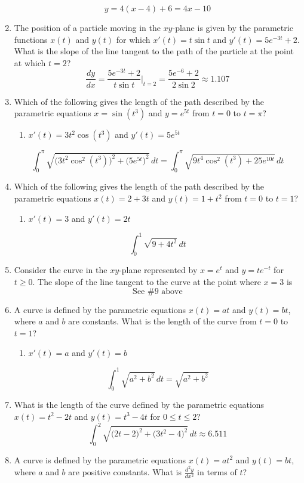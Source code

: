 \documentclass[12pt]{article}
\begin{document}
\begin{enumerate}
\begin{enumerate}
    \end{enumerate}
    $$y= 4(x-4)+6 = \boxed{4x - 10}$$
    \item The position of a particle moving in the $xy$-plane is given by the parametric functions $x(t)$ and $y(t)$ for which $x'(t)=t \sin t$ and $y'(t)=5e^{-3t}+2$. What is the slope of the line tangent to the path of the particle at the point at which $t=2$?
    $$\frac{dy}{dx} = \frac{5e^{-3t}+2}{t \sin t}\biggr\rvert_{t= 2} = \frac{5e^{-6}+2}{2\sin 2} \approx{\boxed{1.107}}$$
    \item Which of the following gives the length of the path described by the parametric equations $x=\sin(t^3)$ and $y=e^{5t}$ from $t=0$ to $t=\pi$?
    \begin{enumerate}
        \item $x'(t) = 3t^2 \cos (t^3)$ and $y'(t) = 5e^{5t}$
    \end{enumerate}
    $$\int_{0}^{\pi} \sqrt{\big(3t^2 \cos^2 (t^3)\big)^2+ \big(5e^{5t} \big)^2} \, dt = \boxed{\int_{0}^{\pi} \sqrt{9t^4 \cos^2 (t^3)+ 25e^{10t}} \, dt }$$
    \item Which of the following gives the length of the path described by the parametric equations $x(t)=2+3t$
    and $y(t)=1+t^2$ from $t=0$ to $t=1$?
    \begin{enumerate}
        \item $x'(t) = 3$ and $y'(t) = 2t$
    \end{enumerate}
    $$\boxed{\int_{0}^{1} \sqrt{9 +4t^2} \, dt }$$
    \item Consider the curve in the $xy$-plane represented by $x=e^t$ and $y=te^{-t}$ for $t\geq 0$. The slope of the line tangent to the curve at the point where $x=3$ is
    $$ \boxed{\text{See \# 9 above}}$$
    \item A curve is defined by the parametric equations $x(t)=at$ and $y(t)=bt$, where $a$ and $b$ are constants. What is the length of the curve from $t=$0 to $t=1$?
    \begin{enumerate}
        \item $x'(t) = a$ and $y'(t) = b$
    \end{enumerate}
    $$\int_{0}^1 \sqrt{a^2+b^2} \, dt = \boxed{\sqrt{a^2+b^2}}$$
    \item What is the length of the curve defined by the parametric equations $x(t)=t^2-2t$ and $y(t)=t^3-4t$ for $0 \leq t \leq 2$?
    $$\int_{0}^{2} \sqrt{\big(2t-2\big)^2 + \big(3t^2-4\big)^2} \, dt \approx \boxed{6.511}$$
    \item A curve is defined by the parametric equations $x(t)=at^2$ and $y(t)=bt$, where $a$ and $b$ are positive constants. What is $\frac{d^2y}{dx^2}$ in terms of $t$?

\end{enumerate}
\end{document}
